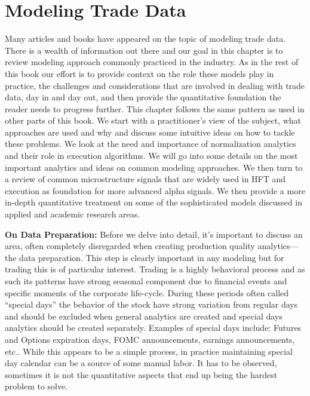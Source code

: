 \chapter{Modeling Trade Data \label{chap:ch_trade_data_models}}

Many articles and books have appeared on the topic of modeling trade data. There is a wealth of information out there and our goal in this chapter is to review modeling approach commonly practiced in the industry. As in the rest of this book our effort is to provide context on the role these models play in practice, the challenges and considerations that are involved in dealing with trade data, day in and day out, and then provide the quantitative foundation the reader needs to progress further. This chapter follows the same pattern as used in other parts of this book. We start with a practitioner's view of the subject, what approaches are used  and why and discuss some intuitive ideas on how to tackle these problems. We look at the need and importance of normalization analytics and their role in execution algorithms. We will go into some details on the most important analytics and ideas on common modeling approaches. We then turn to a review of common microstructure signals that are widely used in HFT and execution as foundation for more advanced alpha signals. We then provide a more in-depth quantitative treatment on some of the sophisticated models discussed in applied and academic research areas. \twomedskip


\noindent\textbf{On Data Preparation:} Before we delve into detail, it's important to discuss an area, often completely disregarded when creating production quality analytics---the data preparation. This step is clearly important in any modeling but for trading this is of particular interest. Trading is a highly behavioral process and as such its patterns have strong seasonal component due to financial events and specific moments of the corporate life-cycle. During these periods often called ``special days'' the behavior of the stock have strong variation from regular days and should be excluded when general analytics are created and special days analytics should be created separately. Examples of special days include: Futures and Options expiration days, FOMC announcements, earnings announcements, etc.. While this appears to be a simple process, in practice maintaining special day calendar can be a source of some manual labor. It has to be observed, sometimes it is not the quantitative aspects that end up being the hardest problem to solve.



